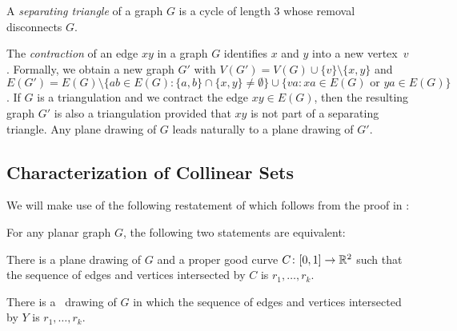 A \emph{separating triangle} of a graph $G$ is
a cycle of length 3
 whose removal disconnects $G$.

The \emph{contraction} of an edge $xy$ in a graph $G$ identifies $x$
and $y$
into a new vertex~$v$.
Formally, we obtain a new graph $G'$ with
$V(G')=V(G)\cup\{v\}\setminus\{x,y\}$ and $E(G')=E(G)\setminus\{ab\in
E(G): \{a,b\}\cap\{x,y\}\neq\emptyset\}\cup\{va: xa\in E(G)\text{ or }
ya\in E(G)\}$.  
If $G$ is a triangulation and we
contract the edge $xy\in E(G)$, then the resulting graph $G'$ is also
a triangulation provided that $xy$ is not part of a separating
triangle. %
Any plane drawing of $G$ leads naturally
to a plane drawing of $G'$.

\subsection{Characterization of Collinear Sets}





We will make use of the following restatement of 
which follows from the proof in \cite{dalozzo.dujmovic.ea:drawing}:
\begin{thm}
  For any planar graph $G$, the following two statements are equivalent:
  \begin{compactenum}
    \item There is a plane drawing of $G$ and a proper good curve $C\colon
      [0,1]\to\mathbb{R}^2$ such that the sequence of edges and vertices
      intersected by $C$ is $r_1,\ldots,r_k$.
    \item There is a \Fary\ drawing of $G$ in which the sequence of
      edges and vertices intersected by $Y$ is $r_1,\ldots,r_k$.
  \end{compactenum}
\end{thm}


